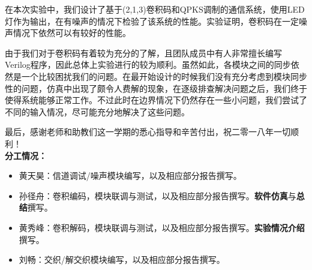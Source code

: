在本次实验中，我们设计了基于(2,1,3)卷积码和QPKS调制的通信系统，使用LED灯作为输出，在有噪声的情况下检验了该系统的性能。实验证明，卷积码在一定噪声情况下依然可以有较好的性能。

由于我们对于卷积码有着较为充分的了解，且团队成员中有人非常擅长编写Verilog程序，因此总体上实验进行的较为顺利。虽然如此，各模块之间的同步依然是一个比较困扰我们的问题。在最开始设计的时候我们没有充分考虑到模块同步性的问题，仿真中出现了颇令人费解的现象，在逐级排查解决问题之后，我们终于使得系统能够正常工作。不过此时在边界情况下仍然存在一些小问题，我们尝试了不同的输入情况，尽可能充分地解决了这些问题。

最后，感谢老师和助教们这一学期的悉心指导和辛苦付出，祝二零一八年一切顺利！\\
 
  
   
    
{\bf \Large 分工情况：}
\begin{itemize}
\item 黄天昊：信道调试/噪声模块编写，以及相应部分报告撰写。
\item 孙径舟：卷积编码，模块联调与测试，以及相应部分报告撰写。{\bf 软件仿真}与{\bf 总结}撰写。
\item 黄秀峰：卷积解码，模块联调与测试，以及相应部分报告撰写。{\bf 实验情况介绍}撰写。
\item 刘畅：交织/解交织模块编写，以及相应部分报告撰写。
\end{itemize}

